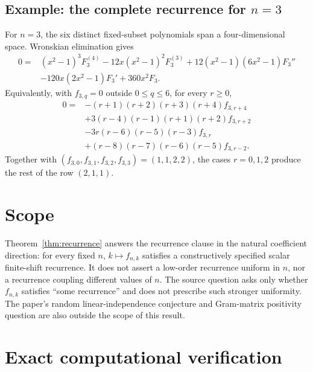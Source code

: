 \documentclass[11pt]{article}
\begin{document}
\subsection*{Example: the complete recurrence for $n=3$}

For $n=3$, the six distinct fixed-subset polynomials span a
four-dimensional space. Wronskian elimination gives
\begin{align*}
0={}&(x^2-1)^3F_3^{(4)}-12x(x^2-1)^2F_3^{(3)}
+12(x^2-1)(6x^2-1)F_3''\\
&-120x(2x^2-1)F_3'+360x^2F_3.
\end{align*}
Equivalently, with $f_{3,q}=0$ outside $0\leq q\leq6$, for every $r\geq0$,
\begin{align*}
0={}&-(r+1)(r+2)(r+3)(r+4)f_{3,r+4}\\
&+3(r-4)(r-1)(r+1)(r+2)f_{3,r+2}\\
&-3r(r-6)(r-5)(r-3)f_{3,r}\\
&+(r-8)(r-7)(r-6)(r-5)f_{3,r-2}.
\end{align*}
Together with $(f_{3,0},f_{3,1},f_{3,2},f_{3,3})=(1,1,2,2)$, the cases
$r=0,1,2$ produce the rest of the row $(2,1,1)$.

\section{Scope}

Theorem~\ref{thm:recurrence} answers the recurrence clause in the natural
coefficient direction: for every fixed $n$, $k\mapsto f_{n,k}$ satisfies a
constructively specified scalar finite-shift recurrence. It does not assert
a low-order recurrence uniform in $n$, nor a recurrence coupling different
values of $n$. The source question asks only whether $f_{n,k}$ satisfies
``some recurrence'' and does not prescribe such stronger uniformity.
The paper's random linear-independence conjecture and Gram-matrix positivity
question are also outside the scope of this result.

\section{Exact computational verification}
\end{document}
